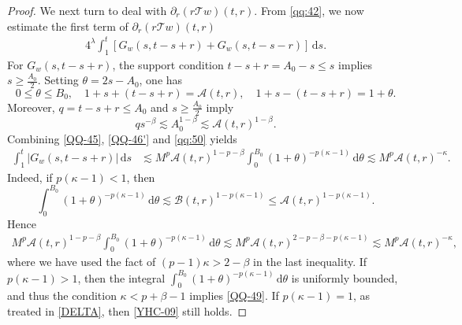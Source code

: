 \documentclass[11pt,twoside]{article}
\newcommand{\p}{\partial}
\newcommand{\f}{\frac}
\newcommand{\Acal}{\mathcal A}
\newcommand{\Bcal}{\mathcal B}
\newcommand{\dd}{\,\mathrm{d}}
\newcommand{\Tcal}{\mathcal T}
\theoremstyle{plain}
\theoremstyle{definition}
\theoremstyle{remark}
\numberwithin{equation}{section}
\begin{document}
\begin{proof}
We next turn to deal with $\p_r(r\Tcal w)(t,r)$. From \eqref{qq:42}, we now estimate the first term of $\p_r(r\Tcal w)(t,r)$
\begin{equation}\label{YHC-08}
\begin{aligned}
4^\lambda
\int_1^t
\left[
G_w(s,t-s+r)
+
G_w(s,t-s-r)
\right]\dd s.
\end{aligned}
\end{equation}
For $G_w(s,t-s+r)$, the support condition
$t-s+r=A_0-s\leq s$ implies $s\geq\f{A_0}{2}$.
Setting $\theta=2s-A_0$, one has
\begin{equation}\label{QQ-46}
0\leq\theta\leq B_0,
\quad
1+s+(t-s+r)=\Acal(t,r),
\quad
1+s-(t-s+r)=1+\theta.
\end{equation}
Moreover, $q=t-s+r\leq A_0$ and $s\geq \f{A_0}{2}$ imply
\begin{equation}\label{QQ-46'}
q s^{-\beta}
\lesssim
A_0^{1-\beta}
\lesssim
\Acal(t,r)^{1-\beta}.
\end{equation}
Combining \eqref{QQ-45},  \eqref{QQ-46'} and \eqref{qq:50} yields
\begin{equation}\label{QQ-49}
\begin{aligned}
\int_1^t
|G_w(s,t-s+r)|\dd s
&\lesssim
M^p
\Acal(t,r)^{1-p-\beta}
\int_0^{B_0}
(1+\theta)^{-p(\kappa-1)}\dd\theta\lesssim
M^p\Acal(t,r)^{-\kappa}.
\end{aligned}
\end{equation}
Indeed, if $p(\kappa-1)<1$, then
\[
\int_0^{B_0}
(1+\theta)^{-p(\kappa-1)}\dd\theta
\lesssim
\Bcal(t,r)^{1-p(\kappa-1)}
\leq
\Acal(t,r)^{1-p(\kappa-1)}.
\]
Hence
\begin{equation}\label{YHC-09}
\begin{aligned}
M^p\Acal(t,r)^{1-p-\beta}
\int_0^{B_0}
(1+\theta)^{-p(\kappa-1)}\dd\theta
\lesssim M^p
\Acal(t,r)^{2-p-\beta-p(\kappa-1)}
\lesssim
M^p\Acal(t,r)^{-\kappa},
\end{aligned}
\end{equation}
where  we have used the fact of
$(p-1)\kappa>2-\beta$ in the last inequality.
If $p(\kappa-1)>1$, then the integral $\int_0^{B_0}
(1+\theta)^{-p(\kappa-1)}\dd\theta$ is uniformly bounded, and thus the condition
$\kappa<p+\beta-1$ implies \eqref{QQ-49}.
If $p(\kappa-1)=1$, as treated in \eqref{DELTA}, then \eqref{YHC-09} still holds.



\end{proof}
\end{document}
